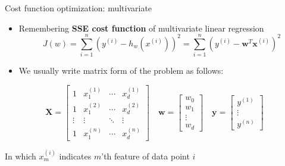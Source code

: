 \documentclass[serif, aspectratio=169]{beamer}
\begin{document}
\begin{frame}{Cost function optimization: multivariate}
    \begin{itemize}
        \item Remembering \textbf{SSE cost function} of multivariate linear regression
            \[
            J(w) = \sum_{i=1}^{n} \left( y^{(i)} - h_w(x^{(i)}) \right)^2 = \sum_{i=1}^{n} \left( y^{(i)} - \mathbf{w}^T \mathbf{x}^{(i)} \right)^2
            \]
        \item We usually write matrix form of the problem as follows:
        
    \end{itemize}
    
    \[
    \mathbf{X} =
    \begin{bmatrix}
    1 & x_1^{(1)} & \cdots & x_d^{(1)} \\
    1 & x_1^{(2)} & \cdots & x_d^{(2)} \\
    \vdots & \vdots & \ddots & \vdots \\
    1 & x_1^{(n)} & \cdots & x_d^{(n)}
    \end{bmatrix}
    \quad
    \mathbf{w} =
    \begin{bmatrix}
    w_0 \\
    w_1 \\
    \vdots \\
    w_d
    \end{bmatrix}
    \quad
    \mathbf{y} =
    \begin{bmatrix}
    y^{(1)} \\
    \vdots \\
    y^{(n)}
    \end{bmatrix}
    \]
    
    \begin{center}
    In which \( x_m^{(i)} \) indicates \(m \)'th feature of data point \( i\) \\
    \end{center}

\end{frame}
\end{document}
